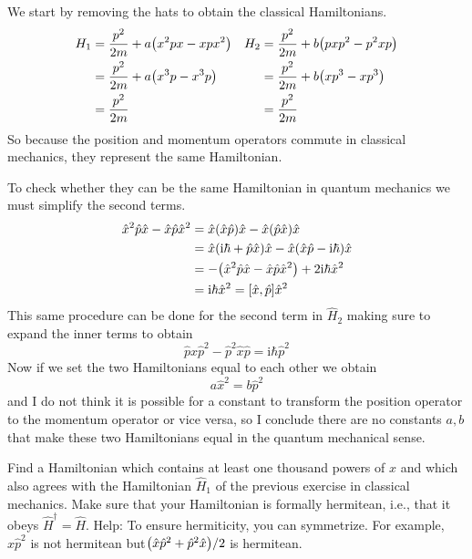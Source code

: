 \documentclass[boxes,pages]{homework}
\makeatletter
\newcommand{\iu}{\mathrm{i}}
\numberwithin{@problem}{section}
\makeatother
\begin{document}
\begin{solution}
	We start by removing the hats to obtain the classical Hamiltonians.
	\begin{align*}
		H_1 & = \frac{p^2}{2m} + a\qty(x^2px - xpx^2) & H_2 & = \frac{p^2}{2m} + b\qty(pxp^2 - p^2xp) \\
		    & = \frac{p^2}{2m} + a\qty(x^3p - x^3p)   &     & = \frac{p^2}{2m} + b\qty(xp^3 - xp^3)   \\
		    & = \frac{p^2}{2m}                        &     & = \frac{p^2}{2m}
	\end{align*}
	So because the position and momentum operators commute in classical mechanics, they represent the same Hamiltonian.

	To check whether they can be the same Hamiltonian in quantum mechanics we must simplify the second terms.
	\begin{align*}
		\hat{x}^2\hat{p}\hat{x} - \hat{x}\hat{p}\hat{x}^2 & = \hat{x}(\hat{x}\hat{p})\hat{x} -\hat{x}(\hat{p}\hat{x})\hat{x}                      \\
		                                                  & = \hat{x}(\iu\hbar + \hat{p}\hat{x})\hat{x} -\hat{x}(\hat{x}\hat{p} -\iu\hbar)\hat{x} \\
		                                                  & = -\qty(\hat{x}^2\hat{p}\hat{x} - \hat{x}\hat{p}\hat{x}^2) + 2\iu\hbar \hat{x}^2      \\
		                                                  & = \iu\hbar \hat{x}^2 = \comm{\hat{x}}{\hat{p}}\hat{x}^2
	\end{align*}
	This same procedure can be done for the second term in $\widehat{H}_2$ making sure to expand the inner terms to obtain
	\begin{equation*}
		\hat{p}\hat{x}\hat{p}^2 - \hat{p}^2\hat{x}\hat{p} = \iu\hbar \hat{p}^2
	\end{equation*}
	Now if we set the two Hamiltonians equal to each other we obtain
	\begin{equation*}
		a\hat{x}^2 = b\hat{p}^2
	\end{equation*}
	and I do not think it is possible for a constant to transform the position operator to the momentum operator or vice versa, so I conclude there are no constants $a, b$ that make these two Hamiltonians equal in the quantum mechanical sense.

\end{solution}

\begin{problem}
Find a Hamiltonian which contains at least one thousand powers of $\hat{x}$ and which also agrees with the Hamiltonian $\hat{H}_1$ of the previous exercise in classical mechanics. Make sure that your Hamiltonian is formally hermitean, i.e., that it obeys $\hat{H}^\dagger = \hat{H}$. Help: To ensure hermiticity, you can symmetrize. For example, $\hat{x}\hat{p}^2$ is not hermitean but$\qty(\hat{x}\hat{p}^2 + \hat{p}^2\hat{x})/2$ is hermitean.
\end{problem}
\end{document}
